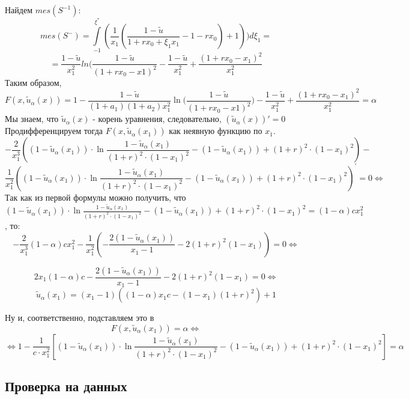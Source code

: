 \documentclass[18pt,a4paper]{article}
\theoremstyle{plain}
\theoremstyle{definition}
\begin{document}
Найдем $mes(S^{-1})$:
$$
mes(S^-)=\int\limits_{-1}^{\xi^*} (\frac{1}{x_1}(\frac{1 - \tilde{u}}{1+rx_0+\xi_1 x_1}-1-rx_0)+1)) d\xi_1 =
$$
$$
=\frac{1 - \tilde{u}}{x_1^2}ln(\frac{1 - \tilde{u}}{(1+rx_0-x1)^2}-\frac{1 - \tilde{u}}{x_1^2}+\frac{(1+rx_0-x_1)^2}{x_1^2}
$$
Таким образом,
$$
F(x,\tilde{u}_\alpha (x)) = 1 -\frac{1 - \tilde{u}}{(1+a_1)(1+a_2)x_1^2}\ln\Big(\frac{1 - \tilde{u}}{(1+rx_0-x1)^2}\Big)-\frac{1 - \tilde{u}}{x_1^2}+\frac{(1+rx_0-x_1)^2}{x_1^2} = \alpha
$$
Мы знаем, что $\tilde{u}_\alpha (x)$ - корень уравнения, следовательно, $(\tilde{u}_\alpha (x))' = 0$\\

\vspace{1pc}
Продифференцируем тогда $F(x,\tilde{u}_\alpha(x_1))$ как неявную функцию по $x_1$.\\
\vspace{1pc}
$$
-\frac{2}{x_1^3}\left( (1-\tilde{u}_\alpha(x_1) )\cdot \ln \frac{1-\tilde{u}_\alpha(x_1)}{(1+r)^2 \cdot (1-x_1)^2} - (1-\tilde{u}_\alpha(x_1)) + (1+r)^2 \cdot (1-x_1)^2 \right) -
$$
$$
\frac{1}{x_1^2}\left(  (1-\tilde{u}_\alpha(x_1) )\cdot \ln \frac{1-\tilde{u}_\alpha(x_1)}{(1+r)^2 \cdot (1-x_1)^2} - (1-\tilde{u}_\alpha(x_1)) + (1+r)^2 \cdot (1-x_1)^2  \right)^\prime  = 0 \Leftrightarrow
$$
\vspace{2pc}
Так как из первой формулы можно получить, что $ (1-\tilde{u}_\alpha(x_1)) \cdot \ln \frac{1-\tilde{u}_\alpha(x_1)}{(1+r)^2 \cdot (1-x_1)^2} - (1-\tilde{u}_\alpha(x_1)) + (1+r)^2 \cdot (1-x_1)^2 = (1-\alpha) c x_1^2$, то:\\

\vspace{2pc}
$$
-\frac{2}{x_1^3} (1-\alpha)cx_1^2 - \frac{1}{x_1^2}\left(-\frac{2 (1-\tilde{u}_\alpha(x_1))}{x_1-1} - 2(1+r)^2(1-x_1)\right)=0 \Leftrightarrow
$$

$$
2x_1(1-\alpha)c - \frac{2 (1-\tilde{u}_\alpha(x_1))}{x_1-1} - 2(1+r)^2(1-x_1)=0 \Leftrightarrow
$$
$$
\tilde{u}_\alpha(x_1) = (x_1-1)\left((1-\alpha)x_1c - (1-x_1)(1+r)^2 \right)+1
$$

Ну и, соответственно, подставляем это в
$$
F(x,\tilde{u}_\alpha(x_1)) = \alpha \Leftrightarrow
$$
$$
\Leftrightarrow 1-\frac{1}{c \cdot x_1^2}\left[ (1-\tilde{u}_\alpha(x_1)) \cdot \ln \frac{1-\tilde{u}_\alpha(x_1)}{(1+r)^2 \cdot (1-x_1)^2} - (1 - \tilde{u}_\alpha(x_1)) +(1+r)^2 \cdot (1-x_1)^2 \right] = \alpha
$$

\centering\subsection{Проверка на данных}
\vspace{2pc}
\flushleft
\end{document}
